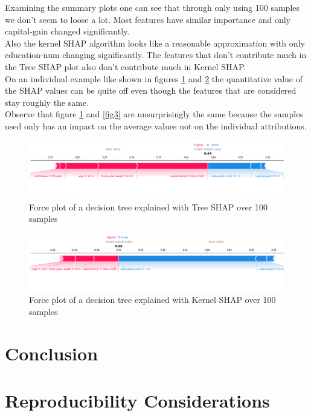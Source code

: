 \documentclass[conference]{IEEEtran}
\begin{document}
Examining the summary plots one can see that through only using 100 samples we don't seem to loose a lot. Most features have similar importance and only capital-gain changed significantly.\\
Also the kernel SHAP algorithm looks like a reasonable approximation with only education-num changing significantly. 
The features that don't contribute much in the Tree SHAP plot also don't contribute much in Kernel SHAP.\\
On an individual example like shown in figures \ref{fig8} and \ref{fig9} the quantitative value of the SHAP values can be quite off even though the features that are considered stay roughly the same.\\
Observe that figure \ref{fig8} and \ref{fig3} are unsurprisingly the same because the samples used only has an impact on the average values not on the individual attributions.

\begin{figure}[htbp]
\centerline{
	\includegraphics[width=\linewidth]{../fig/ex_02_TreeShap_100_Samples_ForcePlot_sample_1.png}
}
\caption{Force plot of a decision tree explained with Tree SHAP over 100 samples}
\label{fig8}
\end{figure}

\begin{figure}[htbp]
\centerline{
	\includegraphics[width=\linewidth]{../fig/ex_02_KernelShap_100_Samples_ForcePlot_sample_1.png}
}
\caption{Force plot of a decision tree explained with Kernel SHAP over 100 samples}
\label{fig9}
\end{figure}


\section{Conclusion}
\label{Conclusion}

\section{Reproducibility Considerations} 
\label{Reproducibility}
\end{document}
